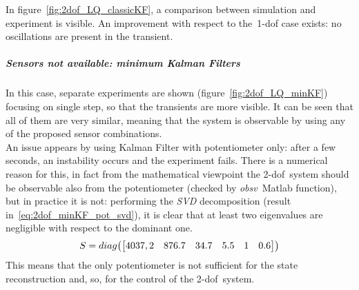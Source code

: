 In figure~\ref{fig:2dof_LQ_classicKF}, a comparison between simulation and experiment is visible. An improvement with respect to the~\acrshort{1-dof} case exists: no oscillations are present in the transient.

\subparagraph{Sensors not available: minimum Kalman Filters}

In this case, separate experiments are shown (figure~\ref{fig:2dof_LQ_minKF}) focusing on single step, so that the transients are more visible. It can be seen that all of them are very similar, meaning that the system is observable by using any of the proposed sensor combinations. \\
An issue appears by using Kalman Filter with potentiometer only: after a few seconds, an instability occurs and the experiment fails. There is a numerical reason for this, in fact from the mathematical viewpoint the \acrshort{2-dof}~system should be observable also from the potentiometer (checked by \textit{obsv}~Matlab function), but in practice it is not: performing the \textit{SVD} decomposition (result in~\ref{eq:2dof_minKF_pot_svd}), it is clear that at least two eigenvalues are negligible with respect to the dominant one.
\begin{equation}
	S = diag
	\bigl{(}
	\begin{bmatrix}
		4037,2 & 876.7 & 34.7 & 5.5 & 1 & 0.6
	\end{bmatrix}
	\bigr{)}
	\label{eq:2dof_minKF_pot_svd}
\end{equation}
This means that the only potentiometer is not sufficient for the state reconstruction and, so, for the control of the \acrshort{2-dof}~system.

